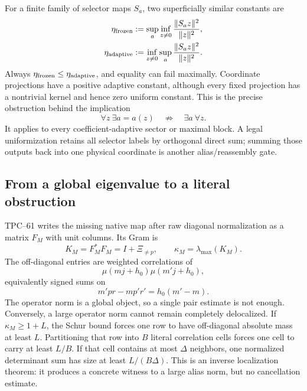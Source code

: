 For a finite family of selector maps \(S_a\), two superficially similar
constants are
\begin{align}
 \eta_{\rm frozen}
 &:=\sup_a\inf_{z\ne0}
   \frac{\|S_az\|^2}{\|z\|^2},
 \label{eq:tpc62-intro-frozen}\\
 \eta_{\rm adaptive}
 &:=\inf_{z\ne0}\sup_a
   \frac{\|S_az\|^2}{\|z\|^2}.
 \label{eq:tpc62-intro-adaptive}
\end{align}
Always \(\eta_{\rm frozen}\le\eta_{\rm adaptive}\), and equality can
fail maximally.  Coordinate projections have a positive adaptive constant,
although every fixed projection has a nontrivial kernel and hence zero
uniform constant.  This is the precise obstruction behind the implication
\[
 \forall z\ \exists a=a(z)
 \quad\not\Longrightarrow\quad
 \exists a\ \forall z.
\]
It applies to every coefficient-adaptive sector or maximal block.  A legal
uniformization retains all selector labels by orthogonal direct sum; summing
those outputs back into one physical coordinate is another alias/reassembly
gate.

\subsection{From a global eigenvalue to a literal obstruction}

TPC--61 writes the missing native map after raw diagonal normalization as a
matrix \(F_M\) with unit columns.  Its Gram is
\begin{equation}
 K_M=F_M^*F_M=I+\Xi_{\ne p},
 \qquad
 \kappa_M=\lambda_{\max}(K_M).
 \label{eq:tpc62-intro-missing-gram}
\end{equation}
The off-diagonal entries are weighted correlations of
\begin{equation}
 \mu(mj+h_0)\mu(m'j+h_0),
 \label{eq:tpc62-intro-two-affine}
\end{equation}
equivalently signed sums on
\begin{equation}
 m'pr-mp'r'=h_0(m'-m).
 \label{eq:tpc62-intro-determinant}
\end{equation}
The operator norm is a global object, so a single pair estimate is not
enough.  Conversely, a large operator norm cannot remain completely
delocalized.  If \(\kappa_M\ge1+L\), the Schur bound forces one row to have
off-diagonal absolute mass at least \(L\).  Partitioning that row into
\(B\) literal correlation cells forces one cell to carry at least \(L/B\).  If that
cell contains at most \(\Delta\) neighbors, one normalized determinant sum
has size at least \(L/(B\Delta)\).  This is an inverse localization theorem:
it produces a concrete witness to a large alias norm, but no cancellation
estimate.

